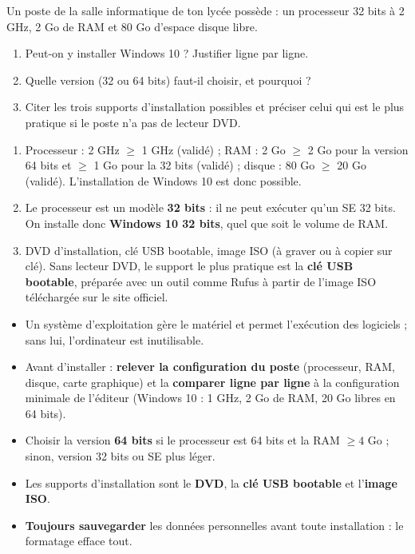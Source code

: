 \documentclass[11pt]{article}
\newcommand{\cle}[1]{{\popxbold\color{popdark}#1}}
\begin{document}
\begin{exercice}
Un poste de la salle informatique de ton lycée possède : un processeur 32 bits à 2 GHz, 2 Go de RAM et 80 Go d'espace disque libre.
\begin{enumerate}
\item Peut-on y installer Windows 10 ? Justifier ligne par ligne.
\item Quelle version (32 ou 64 bits) faut-il choisir, et pourquoi ?
\item Citer les trois supports d'installation possibles et préciser celui qui est le plus pratique si le poste n'a pas de lecteur DVD.
\end{enumerate}
\end{exercice}

\begin{corrige}
\begin{enumerate}
\item Processeur : 2 GHz $\geq$ 1 GHz (validé) ; RAM : 2 Go $\geq$ 2 Go pour la version 64 bits et $\geq$ 1 Go pour la 32 bits (validé) ; disque : 80 Go $\geq$ 20 Go (validé). L'installation de Windows 10 est donc possible.
\item Le processeur est un modèle \textbf{32 bits} : il ne peut exécuter qu'un SE 32 bits. On installe donc \textbf{Windows 10 32 bits}, quel que soit le volume de RAM.
\item DVD d'installation, clé USB bootable, image ISO (à graver ou à copier sur clé). Sans lecteur DVD, le support le plus pratique est la \textbf{clé USB bootable}, préparée avec un outil comme Rufus à partir de l'image ISO téléchargée sur le site officiel.
\end{enumerate}
\end{corrige}

\begin{aretenir}
\begin{itemize}
\item Un \cle{système d'exploitation} gère le matériel et permet l'exécution des logiciels ; sans lui, l'ordinateur est inutilisable.
\item Avant d'installer : \textbf{relever la configuration du poste} (processeur, RAM, disque, carte graphique) et la \textbf{comparer ligne par ligne} à la configuration minimale de l'éditeur (Windows 10 : 1 GHz, 2 Go de RAM, 20 Go libres en 64 bits).
\item Choisir la version \textbf{64 bits} si le processeur est 64 bits et la RAM $\geq 4$ Go ; sinon, version 32 bits ou SE plus léger.
\item Les supports d'installation sont le \textbf{DVD}, la \textbf{clé USB bootable} et l'\textbf{image ISO}.
\item \textbf{Toujours sauvegarder} les données personnelles avant toute installation : le formatage efface tout.
\end{itemize}
\end{aretenir}
\end{document}
